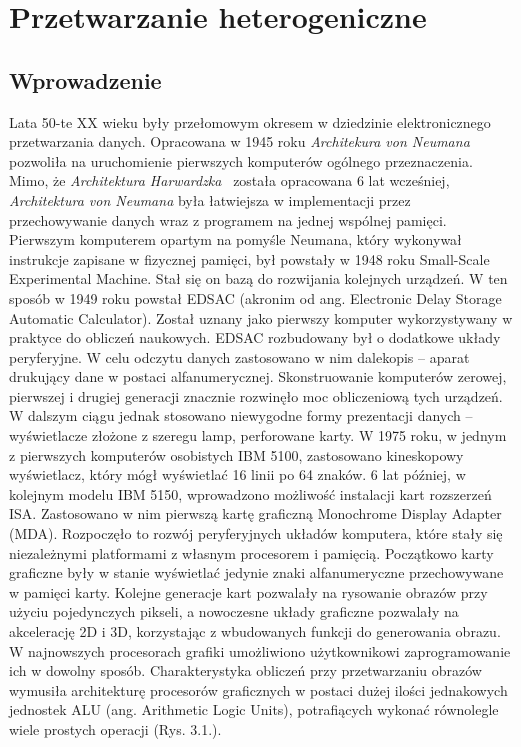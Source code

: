 \chapter{Przetwarzanie heterogeniczne}\label{cha:hpo}


\section{Wprowadzenie}\label{sec:wprowadzenie}


Lata 50-te XX wieku były przełomowym okresem w dziedzinie elektronicznego przetwarzania danych. Opracowana w 1945 roku \emph{Architekura von Neumana}~\cite{b16} pozwoliła na uruchomienie pierwszych komputerów ogólnego przeznaczenia. Mimo, że \emph{Architektura Harwardzka}~\cite{b17} została opracowana 6 lat wcześniej, \emph{Architektura von Neumana} była łatwiejsza w implementacji przez przechowywanie danych wraz z programem na jednej wspólnej pamięci. Pierwszym komputerem opartym na pomyśle Neumana, który wykonywał instrukcje zapisane w fizycznej pamięci, był powstały w 1948 roku Small-Scale Experimental Machine. Stał się on bazą do rozwijania kolejnych urządzeń. W ten sposób w 1949 roku powstał EDSAC (akronim od ang. Electronic Delay Storage Automatic Calculator). Został uznany jako  pierwszy komputer wykorzystywany w praktyce do obliczeń naukowych. EDSAC rozbudowany był o dodatkowe układy peryferyjne. W celu odczytu danych zastosowano w nim dalekopis – aparat drukujący dane w postaci alfanumerycznej. Skonstruowanie komputerów zerowej, pierwszej i drugiej generacji znacznie rozwinęło moc obliczeniową tych urządzeń. W dalszym ciągu jednak stosowano niewygodne formy prezentacji danych – wyświetlacze złożone z szeregu lamp, perforowane karty. W 1975 roku, w jednym z pierwszych komputerów osobistych IBM 5100, zastosowano kineskopowy wyświetlacz, który mógł wyświetlać 16 linii po 64 znaków. 6 lat później, w kolejnym modelu IBM 5150, wprowadzono możliwość instalacji kart rozszerzeń ISA. Zastosowano w nim pierwszą kartę graficzną Monochrome Display Adapter (MDA). Rozpoczęło to rozwój peryferyjnych układów komputera, które stały się niezależnymi platformami z własnym procesorem i pamięcią. Początkowo karty graficzne były w stanie wyświetlać jedynie znaki alfanumeryczne przechowywane w pamięci karty. Kolejne generacje kart pozwalały na rysowanie obrazów przy użyciu pojedynczych pikseli, a nowoczesne układy graficzne pozwalały na akcelerację 2D i 3D, korzystając z wbudowanych funkcji do generowania obrazu. W najnowszych procesorach grafiki umożliwiono użytkownikowi zaprogramowanie ich w dowolny sposób. Charakterystyka obliczeń przy przetwarzaniu obrazów wymusiła architekturę procesorów graficznych w postaci dużej ilości jednakowych jednostek ALU (ang. Arithmetic Logic Units), potrafiących wykonać równolegle wiele prostych operacji (Rys. 3.1.).

